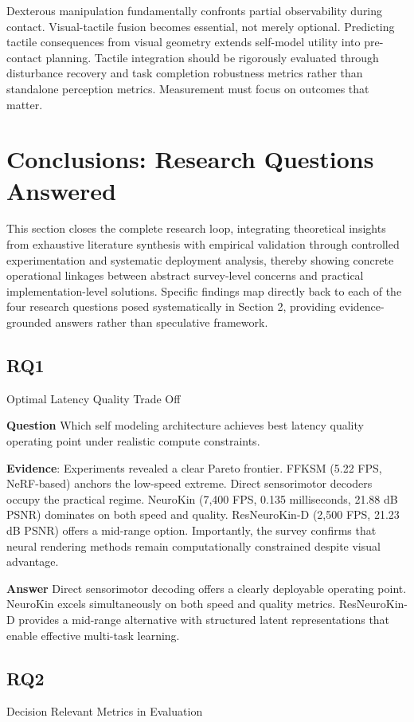 ﻿\documentclass[11pt,a4paper]{article}
\begin{document}
Dexterous manipulation fundamentally confronts partial observability during contact. Visual-tactile fusion becomes essential, not merely optional. Predicting tactile consequences from visual geometry extends self-model utility into pre-contact planning. Tactile integration should be rigorously evaluated through disturbance recovery and task completion robustness metrics rather than standalone perception metrics. Measurement must focus on outcomes that matter.

\section{Conclusions: Research Questions Answered}

This section closes the complete research loop, integrating theoretical insights from exhaustive literature synthesis with empirical validation through controlled experimentation and systematic deployment analysis, thereby showing concrete operational linkages between abstract survey-level concerns and practical implementation-level solutions. Specific findings map directly back to each of the four research questions posed systematically in Section 2, providing evidence-grounded answers rather than speculative framework.

\subsection{RQ1} Optimal Latency Quality Trade Off

\textbf{Question} Which self modeling architecture achieves best latency quality operating point under realistic compute constraints.

\textbf{Evidence}: Experiments revealed a clear Pareto frontier. FFKSM (5.22 FPS, NeRF-based) anchors the low-speed extreme. Direct sensorimotor decoders occupy the practical regime. NeuroKin (7,400 FPS, 0.135 milliseconds, 21.88 dB PSNR) dominates on both speed and quality. ResNeuroKin-D (2,500 FPS, 21.23 dB PSNR) offers a mid-range option. Importantly, the survey confirms that neural rendering methods remain computationally constrained despite visual advantage.

\textbf{Answer} Direct sensorimotor decoding offers a clearly deployable operating point. NeuroKin excels simultaneously on both speed and quality metrics. ResNeuroKin-D provides a mid-range alternative with structured latent representations that enable effective multi-task learning.

\subsection{RQ2} Decision Relevant Metrics in Evaluation
\end{document}
